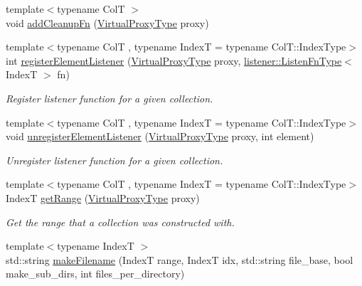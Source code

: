 \begin{DoxyCompactItemize}
\item 
{\footnotesize template$<$typename ColT $>$ }\\void \hyperlink{structvt_1_1vrt_1_1collection_1_1_collection_manager_a3ef00b90a3a2d066a7f83b9c32b301d2}{add\+Cleanup\+Fn} (\hyperlink{namespacevt_a1b417dd5d684f045bb58a0ede70045ac}{Virtual\+Proxy\+Type} proxy)
\item 
{\footnotesize template$<$typename ColT , typename IndexT  = typename Col\+T\+::\+Index\+Type$>$ }\\int \hyperlink{structvt_1_1vrt_1_1collection_1_1_collection_manager_a790738e12739058e7a09b4a3246169e8}{register\+Element\+Listener} (\hyperlink{namespacevt_a1b417dd5d684f045bb58a0ede70045ac}{Virtual\+Proxy\+Type} proxy, \hyperlink{namespacevt_1_1vrt_1_1collection_1_1listener_a62d04c44a3c187eae66bdba2090b4505}{listener\+::\+Listen\+Fn\+Type}$<$ IndexT $>$ fn)
\begin{DoxyCompactList}\small\item\em Register listener function for a given collection. \end{DoxyCompactList}\item 
{\footnotesize template$<$typename ColT , typename IndexT  = typename Col\+T\+::\+Index\+Type$>$ }\\void \hyperlink{structvt_1_1vrt_1_1collection_1_1_collection_manager_aecfd5c34b6d0b6781d3bb089ba1ae547}{unregister\+Element\+Listener} (\hyperlink{namespacevt_a1b417dd5d684f045bb58a0ede70045ac}{Virtual\+Proxy\+Type} proxy, int element)
\begin{DoxyCompactList}\small\item\em Unregister listener function for a given collection. \end{DoxyCompactList}\item 
{\footnotesize template$<$typename ColT , typename IndexT  = typename Col\+T\+::\+Index\+Type$>$ }\\IndexT \hyperlink{structvt_1_1vrt_1_1collection_1_1_collection_manager_a9259954aca1df3a68ad1d0a730687612}{get\+Range} (\hyperlink{namespacevt_a1b417dd5d684f045bb58a0ede70045ac}{Virtual\+Proxy\+Type} proxy)
\begin{DoxyCompactList}\small\item\em Get the range that a collection was constructed with. \end{DoxyCompactList}\item 
{\footnotesize template$<$typename IndexT $>$ }\\std\+::string \hyperlink{structvt_1_1vrt_1_1collection_1_1_collection_manager_ae8d3db4274a1239fa0097dae11e93bb9}{make\+Filename} (IndexT range, IndexT idx, std\+::string file\+\_\+base, bool make\+\_\+sub\+\_\+dirs, int files\+\_\+per\+\_\+directory)

\end{DoxyCompactItemize}
